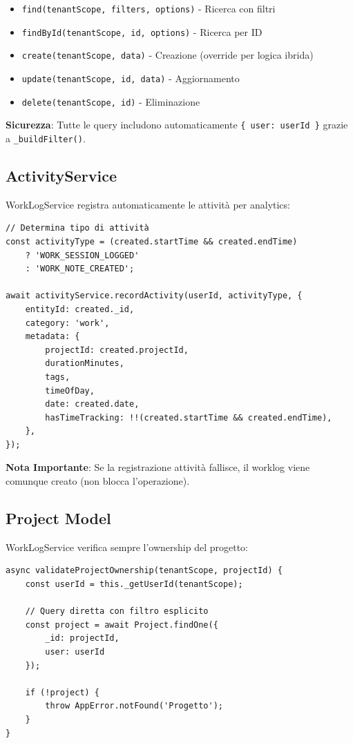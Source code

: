 \documentclass[11pt,a4paper]{article}
\begin{document}
\begin{itemize}
    \item \texttt{find(tenantScope, filters, options)} - Ricerca con filtri
    \item \texttt{findById(tenantScope, id, options)} - Ricerca per ID
    \item \texttt{create(tenantScope, data)} - Creazione (override per logica ibrida)
    \item \texttt{update(tenantScope, id, data)} - Aggiornamento
    \item \texttt{delete(tenantScope, id)} - Eliminazione
\end{itemize}

\textbf{Sicurezza}: Tutte le query includono automaticamente \texttt{\{ user: userId \}} grazie a \texttt{\_buildFilter()}.

\subsection{ActivityService}

WorkLogService registra automaticamente le attività per analytics:

\begin{lstlisting}[caption=Registrazione Attività]
// Determina tipo di attività
const activityType = (created.startTime && created.endTime) 
    ? 'WORK_SESSION_LOGGED' 
    : 'WORK_NOTE_CREATED';

await activityService.recordActivity(userId, activityType, {
    entityId: created._id,
    category: 'work',
    metadata: {
        projectId: created.projectId,
        durationMinutes,
        tags,
        timeOfDay,
        date: created.date,
        hasTimeTracking: !!(created.startTime && created.endTime),
    },
});
\end{lstlisting}

\textbf{Nota Importante}: Se la registrazione attività fallisce, il worklog viene comunque creato (non blocca l'operazione).

\subsection{Project Model}

WorkLogService verifica sempre l'ownership del progetto:

\begin{lstlisting}[caption=Validazione Ownership]
async validateProjectOwnership(tenantScope, projectId) {
    const userId = this._getUserId(tenantScope);
    
    // Query diretta con filtro esplicito
    const project = await Project.findOne({ 
        _id: projectId, 
        user: userId 
    });
    
    if (!project) {
        throw AppError.notFound('Progetto');
    }
}
\end{lstlisting}
\end{document}
